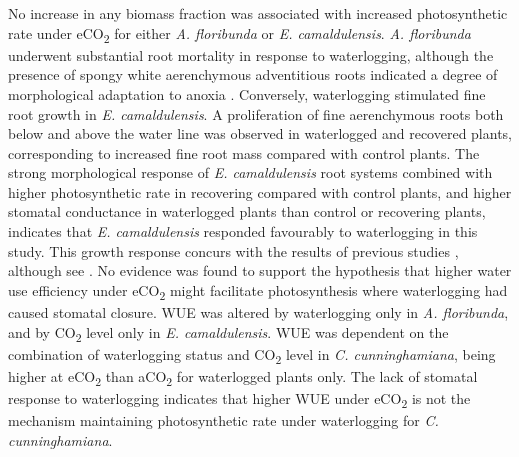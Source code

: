 \documentclass[openright,12pt,a4paper]{memoir}
\begin{document}
No increase in any biomass fraction was associated with increased photosynthetic rate under eCO\textsubscript{2} for either \textit{A. floribunda} or \textit{E. camaldulensis}. \textit{A. floribunda} underwent substantial root mortality in response to waterlogging, although the presence of spongy white aerenchymous adventitious roots indicated a degree of morphological adaptation to anoxia \citep{Evans2004}. Conversely, waterlogging stimulated fine root growth in \textit{E. camaldulensis}. A proliferation of fine aerenchymous roots both below and above the water line was observed in waterlogged and recovered plants, corresponding to increased fine root mass compared with control plants. The strong morphological response of \textit{E. camaldulensis} root systems combined with higher photosynthetic rate in recovering compared with control plants, and higher stomatal conductance in waterlogged plants than control or recovering plants, indicates that \textit{E. camaldulensis} responded favourably to waterlogging in this study. This growth response concurs with the results of previous studies \citep{Sena-Gomes1980, Marcar1993}, although see \citep{Kogawara2006}. No evidence was found to support the hypothesis that higher water use efficiency under eCO\textsubscript{2} might facilitate photosynthesis where waterlogging had caused stomatal closure. WUE was altered by waterlogging only in \textit{A. floribunda}, and by CO\textsubscript{2} level only in \textit{E. camaldulensis}. WUE was dependent on the combination of waterlogging status and CO\textsubscript{2} level in \textit{C. cunninghamiana}, being higher at eCO\textsubscript{2} than aCO\textsubscript{2} for waterlogged plants only. The lack of stomatal response to waterlogging indicates that higher WUE under eCO\textsubscript{2} is not the mechanism maintaining photosynthetic rate under waterlogging for \textit{C. cunninghamiana}. 
\end{document}
